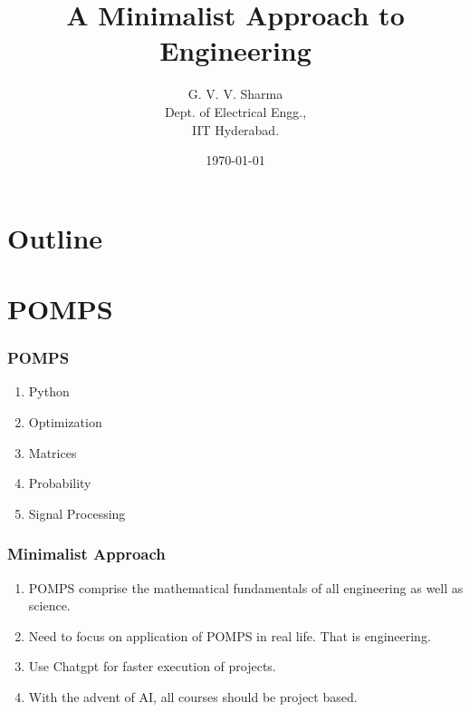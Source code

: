\documentclass{beamer}
\title{A Minimalist Approach to Engineering}
\author{G. V. V. Sharma \\ Dept. of Electrical Engg.,\\IIT Hyderabad.}
\date{\today}
\theoremstyle{remark}
\begin{document}
\begin{frame}
\titlepage
\end{frame}

\section*{Outline}
\begin{frame}
\tableofcontents
\end{frame}
\section{POMPS}
\begin{frame}
\frametitle{POMPS}
\begin{enumerate}
\item Python
\item Optimization
\item Matrices
\item Probability
\item Signal Processing
\end{enumerate}
\end{frame}
%
\begin{frame}
\frametitle{Minimalist Approach}
\begin{enumerate}
\item POMPS comprise the mathematical fundamentals of all engineering as well as science.
\item Need to focus on application of POMPS in real life. That is engineering.
\item Use Chatgpt for faster execution of projects.
\item With the advent of AI, all courses should be project based. 
\end{enumerate}
\end{frame}
%
%
\end{document}
